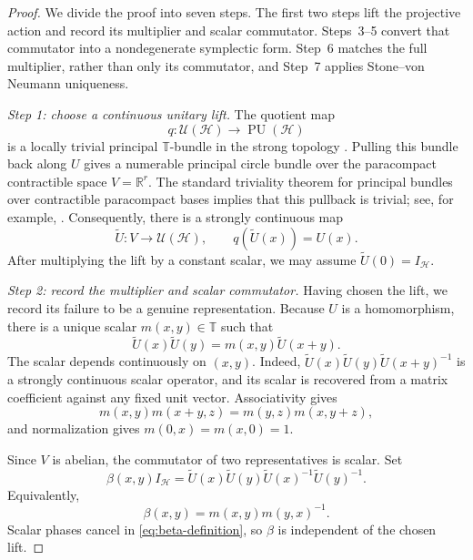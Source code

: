 \documentclass[reqno]{amsart}
\numberwithin{equation}{section}
\theoremstyle{definition}
\theoremstyle{remark}
\newcommand{\cH}{\mathcal H}
\newcommand{\R}{\mathbb R}
\newcommand{\T}{\mathbb T}
\newcommand{\U}{\mathcal U}
\newcommand{\PU}{\operatorname{PU}}
\newcommand{\Step}[1]{\par\medskip\noindent\textit{#1.}\quad}
\begin{document}
\begin{proof}
We divide the proof into seven steps.  The first two steps lift the projective
action and record its multiplier and scalar commutator.  Steps~3--5 convert
that commutator into a nondegenerate symplectic form.  Step~6 matches the full
multiplier, rather than only its commutator, and Step~7 applies
Stone--von Neumann uniqueness.

\Step{Step 1: choose a continuous unitary lift}
The quotient map
\[
 q:\U(\cH)\longrightarrow\PU(\cH)
\]
is a locally trivial principal $\T$-bundle in the strong topology
\cite{Simms1970}.  Pulling this bundle back along $U$ gives a numerable
principal circle bundle over the paracompact contractible space $V=\R^r$.
The standard triviality theorem for principal bundles over contractible
paracompact bases implies that this pullback is trivial; see, for example,
\cite{Husemoller1994}.  Consequently, there is a strongly continuous map
\[
 \widetilde U:V\longrightarrow\U(\cH),
 \qquad q(\widetilde U(x))=U(x).
\]
After multiplying the lift by a constant scalar, we may assume
$\widetilde U(0)=I_{\cH}$.

\Step{Step 2: record the multiplier and scalar commutator}
Having chosen the lift, we record its failure to be a genuine
representation.  Because $U$ is a homomorphism, there is a unique scalar
$m(x,y)\in\T$ such
that
\begin{equation}\label{eq:lift-multiplier}
 \widetilde U(x)\widetilde U(y)=m(x,y)\widetilde U(x+y).
\end{equation}
The scalar depends continuously on $(x,y)$.  Indeed,
$\widetilde U(x)\widetilde U(y)\widetilde U(x+y)^{-1}$ is a strongly
continuous scalar operator, and its scalar is recovered from a matrix
coefficient against any fixed unit vector.  Associativity gives
\begin{equation}\label{eq:multiplier-identity}
 m(x,y)m(x+y,z)=m(y,z)m(x,y+z),
\end{equation}
and normalization gives $m(0,x)=m(x,0)=1$.

Since $V$ is abelian, the commutator of two representatives is scalar.  Set
\begin{equation}\label{eq:beta-definition}
 \beta(x,y)I_{\cH}
 =\widetilde U(x)\widetilde U(y)
  \widetilde U(x)^{-1}\widetilde U(y)^{-1}.
\end{equation}
Equivalently,
\begin{equation}\label{eq:beta-from-m}
 \beta(x,y)=m(x,y)m(y,x)^{-1}.
\end{equation}
Scalar phases cancel in \eqref{eq:beta-definition}, so $\beta$ is independent
of the chosen lift.


\end{proof}
\end{document}
